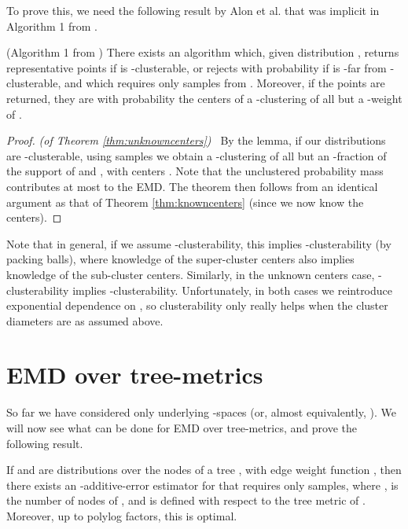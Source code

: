 \documentclass[11pt]{article}
\begin{document}
To prove this, we need the following result by Alon et al. that was implicit in
Algorithm 1 from \cite{cluster}.

\begin{lemma}(Algorithm 1 from \cite{cluster})
	There exists an algorithm which, given distribution , returns 
	representative points if  is -clusterable, or rejects with
	probability  if  is -far from -clusterable, and
	which requires only  samples from . Moreover, if the
	 points are returned, they are with probability  the centers of a
	-clustering of all but a -weight of .
\end{lemma}

\begin{proof}\emph{(of Theorem \ref{thm:unknowncenters})\ }
By the lemma, if our distributions are -clusterable, using
 samples we obtain a -clustering of all but an
-fraction of the support of  and , with
centers . Note that the unclustered probability mass
contributes at most  to the EMD. The theorem then follows from an identical
argument as that of Theorem \ref{thm:knowncenters} (since we now know the centers).
\end{proof}

Note that in general, if we assume -clusterability, this implies
-clusterability (by packing  balls), where knowledge
of the super-cluster centers also implies knowledge of the sub-cluster centers.
Similarly, in the unknown centers case, -clusterability implies
-clusterability. Unfortunately, in both cases we
reintroduce exponential dependence on , so clusterability only really helps
when the cluster diameters are as assumed above.

\section{EMD over tree-metrics}

So far we have considered only underlying -spaces (or, almost equivalently,
). We will now see what can be done for EMD over tree-metrics, and prove
the following result.

\begin{theorem}
	If  and  are distributions over the nodes of a tree , with
	edge weight function , then there exists an -additive-error
	estimator for  that requires only 
	samples, where ,  is the number of nodes of , and  is defined with
	respect to the tree metric of . Moreover, up to polylog factors,
	this is optimal.
\end{theorem}
\end{document}
